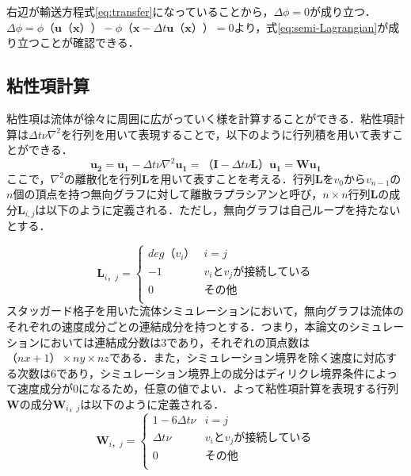 \documentclass[a4j,12pt]{jreport}
\begin{document}
 右辺が輸送方程式\ref{eq:transfer}になっていることから，$ \varDelta \phi =0$が成り立つ．
$\varDelta \phi = \phi（ \bm{u} （\bm{x}）） - \phi （\bm{x} - \varDelta t\bm{u} （\bm{x}））= 0$より，式\ref{eq:semi-Lagrangian}が成り立つことが確認できる．
\subsection{粘性項計算}
粘性項は流体が徐々に周囲に広がっていく様を計算することができる．粘性項計算は$\varDelta t \nu\nabla^2$を行列を用いて表現することで，以下のように行列積を用いて表すことができる．
\begin{equation}\label{eq:discrete Laplacian}
	\bm{u_2}   =  \bm{u_1} - \varDelta t \nu\nabla^2\bm{u_1} = （\mathbf{I} -  \varDelta t \nu\mathbf{L}）\bm{u_1} = \mathbf{W}\bm{u_1}
\end{equation}
ここで，$\nabla^2$の離散化を行列$\mathbf{L}$を用いて表すことを考える．行列$\mathbf{L}$を$v_0$から$v_{n-1}$の$n$個の頂点を持つ無向グラフに対して離散ラプラシアンと呼び，$n \times n$行列$\mathbf{L}$の成分$\mathbf{L}_{i,j}$は以下のように定義される．ただし，無向グラフは自己ループを持たないとする．

\begin{equation}
	\mathbf{L}_{i，j} = \begin{cases}
 	deg（v_i） 	& i = j\\
 	-1  		& v_iとv_jが接続している\\
 	0  		& その他\\
 \end{cases}
\end{equation}
スタッガード格子を用いた流体シミュレーションにおいて，無向グラフは流体のそれぞれの速度成分ごとの連結成分を持つとする．つまり，本論文のシミュレーションにおいては連結成分数は3であり，それぞれの頂点数は$（nx+1） \times ny \times nz$である．また，シミュレーション境界を除く速度に対応する次数は$6$であり，シミュレーション境界上の成分はディリクレ境界条件によって速度成分が$0$になるため，任意の値でよい．よって粘性項計算を表現する行列$\mathbf{W}$の成分$\mathbf{W}_{i，j}$は以下のように定義される．
 \[
 	\mathbf{W}_{i，j}  = \begin{cases}
 	1 - 6 \varDelta t \nu 	& i = j\\
 	 \varDelta t \nu  	& v_iとv_jが接続している\\
 	0  				& その他\\
	 \end{cases}
\]
\end{document}
